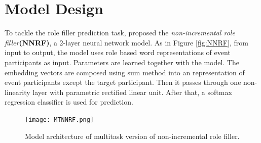 \documentclass[a4paper]{article}
\begin{document}
\section{Model Design}
To tackle the role filler prediction task, \citet{tilk2016event} proposed the \textit{non-incremental role filler}\textbf{(NNRF)}, a 2-layer neural network model. As in Figure \ref{fig:NNRF}, from input to output, the model uses role based word representations of event participants as input. Parameters are learned together with the model. The embedding vectors are composed using sum method into an representation of event participants except the target participant. Then it passes through one non-linearity layer with parametric rectified linear unit. After that, a softmax regression classifier is used for prediction. 


\begin{figure}[t]
\centering
\texttt{[image: MTNNRF.png]}
\caption{\label{fig:MTNNRF} Model architecture of multitask version of non-incremental role filler.}
\end{figure}
\end{document}

